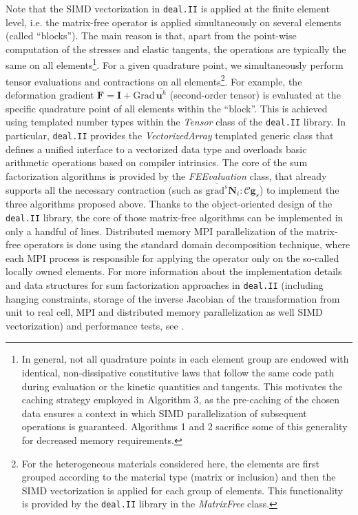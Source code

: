\documentclass[times,doublespace]{nmeauth}
\newcommand*{\gz}[1]{\boldsymbol{#1}}
\newcommand*{\Grad}{\mathrm{Grad}}
\newcommand*{\grad}{\mathrm{grad}}
\begin{document}
Note that the SIMD vectorization
in \texttt{deal.II} \cite{dealII90}
is applied at the finite element level, i.e. the matrix-free operator is applied simultaneously on several elements (called ``blocks'').
The main reason is that, apart from the point-wise computation of the stresses and elastic tangents, the operations are typically the same on all elements\footnote{%
In general, not all quadrature points in each element group are endowed with identical, non-dissipative constitutive laws that follow the same code path during evaluation or the kinetic quantities and tangents.
This motivates the caching strategy employed in Algorithm 3, as the pre-caching of the chosen data ensures a context in which SIMD parallelization of subsequent operations is guaranteed.
Algorithms 1 and 2 sacrifice some of this generality for decreased memory requirements.
}.
For a given quadrature point, we simultaneously perform tensor evaluations and contractions on all elements\footnote{%
For the heterogeneous materials considered here,
the elements are first grouped according to the material type (matrix or inclusion) and then the SIMD vectorization is applied for each group of elements.
This functionality is provided by the \texttt{deal.II} library in the \textit{MatrixFree} class.
}.
For example, the deformation gradient $\gz F = \gz I + \Grad \, \overline{\gz u^h}$ (second-order tensor) is evaluated at the specific quadrature point of all elements within the ``block''.
This is achieved using templated number types within the \textit{Tensor} class of the \texttt{deal.II} library.
In particular, \texttt{deal.II} provides the \textit{VectorizedArray} templated generic class that defines a unified interface to a vectorized data type
and overloads basic arithmetic operations based on compiler intrinsics.
The core of the sum factorization algorithms is provided by the
\textit{FEEvaluation} class, that already supports all the necessary contraction (such as $\overline{\grad^s} \gz N_i : \boldsymbol{\mathcal{C}}\gz g_s$) to implement the three algorithms proposed above.
Thanks to the object-oriented design of the \texttt{deal.II} library, the core of those matrix-free algorithms can be implemented in only a handful of lines.
Distributed memory MPI parallelization of the matrix-free operators is done using the standard domain decomposition technique, where each MPI process is responsible for applying the operator only on the so-called locally owned elements.
For more information about the implementation details and data structures for sum factorization approaches in \texttt{deal.II} (including hanging constraints, storage of the inverse Jacobian of the transformation from unit to real cell, MPI and distributed memory parallelization as well SIMD vectorization) and performance tests, see \cite{kronbichler12}.
\end{document}
